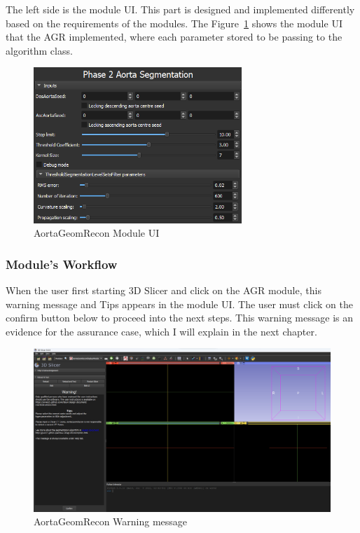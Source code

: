 The left side is the module UI. This part is designed and implemented differently based on the requirements of the modules. The Figure~\ref{fig_module_ui} shows the module UI that the AGR implemented, where each parameter stored to be passing to the algorithm class.

\begin{figure}[H]
    \centering
    \includegraphics[width=0.7\textwidth]{figures/AGR/Module_UI.png}
    \caption[AortaGeomRecon Module UI]{AortaGeomRecon Module UI}
    \label{fig_module_ui}
\end{figure}


\subsubsection{Module's Workflow} \label{module_workflow}
When the user first starting 3D Slicer and click on the AGR module, this warning message and Tips appears in the module UI. The user must click on the confirm button below to proceed into the next steps. This warning message is an evidence for the assurance case, which I will explain in the next chapter.

\begin{figure}[H]
    \centering
    \includegraphics[width=\textwidth]{figures/AGR/AGR_warning.png}
    \caption[AortaGeomRecon Warning message]{AortaGeomRecon Warning message}
    \label{fig_agr_warning}
\end{figure}

